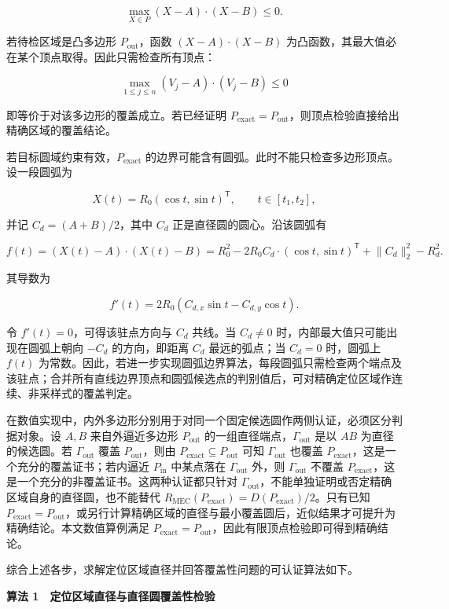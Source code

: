 \[
\max_{X\in P}(X-A)\cdot(X-B)\le0.
\]

若待检区域是凸多边形 $P_{\mathrm{out}}$，函数 $(X-A)\cdot(X-B)$ 为凸函数，其最大值必在某个顶点取得。因此只需检查所有顶点：

\[
\max_{1\le j\le n}(V_j-A)\cdot(V_j-B)\le0
\]

即等价于对该多边形的覆盖成立。若已经证明 $P_{\mathrm{exact}}=P_{\mathrm{out}}$，则顶点检验直接给出精确区域的覆盖结论。

若目标圆域约束有效，$P_{\mathrm{exact}}$ 的边界可能含有圆弧。此时不能只检查多边形顶点。设一段圆弧为

\[
X(t)=R_0(\cos t,\sin t)^{\mathsf T},\qquad t\in[t_1,t_2],
\]

并记 $C_d=(A+B)/2$，其中 $C_d$ 正是直径圆的圆心。沿该圆弧有

\[
f(t)=(X(t)-A)\cdot(X(t)-B)
=R_0^2-2R_0C_d\cdot(\cos t,\sin t)^{\mathsf T}+\lVert C_d\rVert_2^2-R_d^2.
\]

其导数为

\[
f'(t)=2R_0(C_{d,x}\sin t-C_{d,y}\cos t).
\]

令 $f'(t)=0$，可得该驻点方向与 $C_d$ 共线。当 $C_d\ne0$ 时，内部最大值只可能出现在圆弧上朝向 $-C_d$ 的方向，即距离 $C_d$ 最远的弧点；当 $C_d=0$ 时，圆弧上 $f(t)$ 为常数。因此，若进一步实现圆弧边界算法，每段圆弧只需检查两个端点及该驻点；合并所有直线边界顶点和圆弧候选点的判别值后，可对精确定位区域作连续、非采样式的覆盖判定。

在数值实现中，内外多边形分别用于对同一个固定候选圆作两侧认证，必须区分判据对象。设 $A,B$ 来自外逼近多边形 $P_{\mathrm{out}}$ 的一组直径端点，$\Gamma_{\mathrm{out}}$ 是以 $AB$ 为直径的候选圆。若 $\Gamma_{\mathrm{out}}$ 覆盖 $P_{\mathrm{out}}$，则由 $P_{\mathrm{exact}}\subseteq P_{\mathrm{out}}$ 可知 $\Gamma_{\mathrm{out}}$ 也覆盖 $P_{\mathrm{exact}}$，这是一个充分的覆盖证书；若内逼近 $P_{\mathrm{in}}$ 中某点落在 $\Gamma_{\mathrm{out}}$ 外，则 $\Gamma_{\mathrm{out}}$ 不覆盖 $P_{\mathrm{exact}}$，这是一个充分的非覆盖证书。这两种认证都只针对 $\Gamma_{\mathrm{out}}$，不能单独证明或否定精确区域自身的直径圆，也不能替代 $R_{\mathrm{MEC}}(P_{\mathrm{exact}})=D(P_{\mathrm{exact}})/2$。只有已知 $P_{\mathrm{exact}}=P_{\mathrm{out}}$，或另行计算精确区域的直径与最小覆盖圆后，近似结果才可提升为精确结论。本文数值算例满足 $P_{\mathrm{exact}}=P_{\mathrm{out}}$，因此有限顶点检验即可得到精确结论。

综合上述各步，求解定位区域直径并回答覆盖性问题的可认证算法如下。

\textbf{算法 1　定位区域直径与直径圆覆盖性检验}

